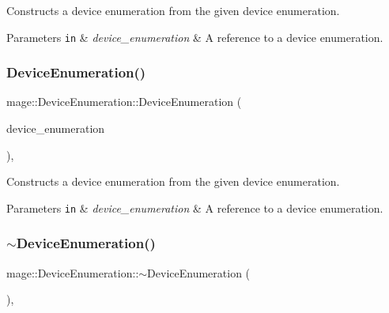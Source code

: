 Constructs a device enumeration from the given device enumeration.


\begin{DoxyParams}[1]{Parameters}
\mbox{\tt in}  & {\em device\+\_\+enumeration} & A reference to a device enumeration. \\
\hline
\end{DoxyParams}
\hypertarget{classmage_1_1_device_enumeration_a392d44d5caa552437a279538083c6d2e}{}\label{classmage_1_1_device_enumeration_a392d44d5caa552437a279538083c6d2e} 
\subsubsection{\texorpdfstring{Device\+Enumeration()}{DeviceEnumeration()}\hspace{0.1cm}{\footnotesize\ttfamily [3/3]}}
{\footnotesize\ttfamily mage\+::\+Device\+Enumeration\+::\+Device\+Enumeration (\begin{DoxyParamCaption}\item[{\hyperlink{classmage_1_1_device_enumeration}{Device\+Enumeration} \&\&}]{device\+\_\+enumeration }\end{DoxyParamCaption})\hspace{0.3cm}{\ttfamily [private]}, {\ttfamily [default]}}

Constructs a device enumeration from the given device enumeration.


\begin{DoxyParams}[1]{Parameters}
\mbox{\tt in}  & {\em device\+\_\+enumeration} & A reference to a device enumeration. \\
\hline
\end{DoxyParams}
\hypertarget{classmage_1_1_device_enumeration_ae32bc5dacf47b7deca4729d8b3cb66dc}{}\label{classmage_1_1_device_enumeration_ae32bc5dacf47b7deca4729d8b3cb66dc} 
\subsubsection{\texorpdfstring{$\sim$\+Device\+Enumeration()}{~DeviceEnumeration()}}
{\footnotesize\ttfamily mage\+::\+Device\+Enumeration\+::$\sim$\+Device\+Enumeration (\begin{DoxyParamCaption}{ }\end{DoxyParamCaption})\hspace{0.3cm}{\ttfamily [private]}, {\ttfamily [default]}}

